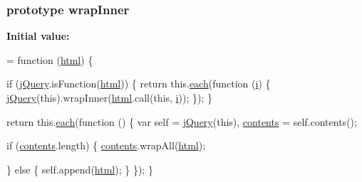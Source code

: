 \subsubsection[{\texorpdfstring{wrap\+Inner}{wrapInner}}]{ {\bf prototype} wrap\+Inner}\hypertarget{jquery-2_82_81-vsdoc_8js_a41a3e550d6fe55baac11c61ed710ec2a}{}\label{jquery-2_82_81-vsdoc_8js_a41a3e550d6fe55baac11c61ed710ec2a}
{\bfseries Initial value\+:}
\begin{DoxyCode}
= \textcolor{keyword}{function} (\hyperlink{jquery-2_82_81-vsdoc_8js_a54a716632718016dd4e400e83a0970e2}{html}) \{
        

        \textcolor{keywordflow}{if} (\hyperlink{jquery-2_82_81-vsdoc_8js_add5237586d970a38a81f990e8eb28c6c}{jQuery}.isFunction(\hyperlink{jquery-2_82_81-vsdoc_8js_a54a716632718016dd4e400e83a0970e2}{html})) \{
            \textcolor{keywordflow}{return} this.\hyperlink{jquery-2_82_81-vsdoc_8js_a77da68323b96573f900f8b5dd3a47954}{each}(\textcolor{keyword}{function} (\hyperlink{geolocation-marker_8js_a0325b7ce0988782a8032e720ef3aa411}{i}) \{
                \hyperlink{jquery-2_82_81-vsdoc_8js_add5237586d970a38a81f990e8eb28c6c}{jQuery}(\textcolor{keyword}{this}).wrapInner(\hyperlink{jquery-2_82_81-vsdoc_8js_a54a716632718016dd4e400e83a0970e2}{html}.call(\textcolor{keyword}{this}, \hyperlink{geolocation-marker_8js_a0325b7ce0988782a8032e720ef3aa411}{i}));
            \});
        \}

        \textcolor{keywordflow}{return} this.\hyperlink{jquery-2_82_81-vsdoc_8js_a77da68323b96573f900f8b5dd3a47954}{each}(\textcolor{keyword}{function} () \{
            var \textcolor{keyword}{self} = \hyperlink{jquery-2_82_81-vsdoc_8js_add5237586d970a38a81f990e8eb28c6c}{jQuery}(\textcolor{keyword}{this}),
                \hyperlink{jquery-2_82_81-vsdoc_8js_af81eeab332c74dc521f6610f4914badd}{contents} = \textcolor{keyword}{self}.contents();

            \textcolor{keywordflow}{if} (\hyperlink{jquery-2_82_81-vsdoc_8js_af81eeab332c74dc521f6610f4914badd}{contents}.length) \{
                \hyperlink{jquery-2_82_81-vsdoc_8js_af81eeab332c74dc521f6610f4914badd}{contents}.wrapAll(\hyperlink{jquery-2_82_81-vsdoc_8js_a54a716632718016dd4e400e83a0970e2}{html});

            \} \textcolor{keywordflow}{else} \{
                \textcolor{keyword}{self}.append(\hyperlink{jquery-2_82_81-vsdoc_8js_a54a716632718016dd4e400e83a0970e2}{html});
            \}
        \});
    \}
\end{DoxyCode}
